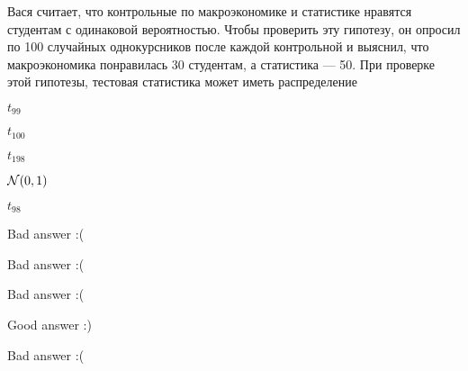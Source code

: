 
\begin{question}
Вася считает, что контрольные по макроэкономике и статистике нравятся
студентам с одинаковой вероятностью. Чтобы проверить эту гипотезу, он
опросил по 100 случайных однокурсников после каждой контрольной и
выяснил, что макроэкономика понравилась 30 студентам, а статистика ---
50. При проверке этой гипотезы, тестовая статистика может иметь
распределение
\begin{answerlist}
  \item \(t_{99}\)
  \item \(t_{100}\)
  \item \(t_{198}\)
  \item \(\mathcal{N}(0,1)\)
  \item \(t_{98}\)
\end{answerlist}
\end{question}

\begin{solution}
\begin{answerlist}
  \item Bad answer :(
  \item Bad answer :(
  \item Bad answer :(
  \item Good answer :)
  \item Bad answer :(
\end{answerlist}
\end{solution}

